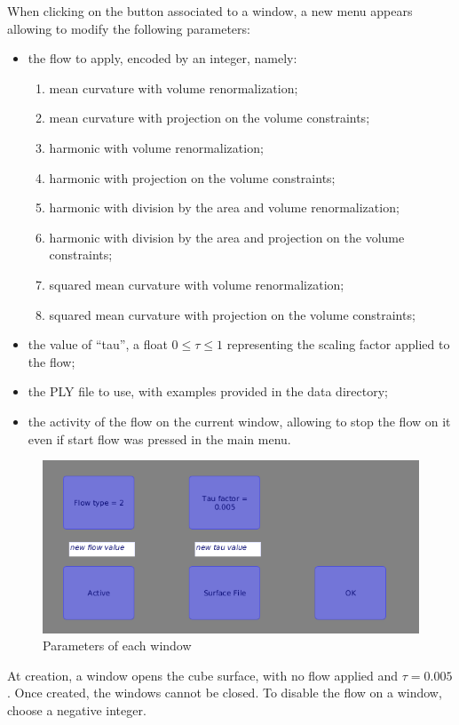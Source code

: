 \documentclass{article}
\begin{document}
When clicking on the button associated to a window, a new menu appears
allowing to modify the following parameters:
\begin{itemize}
  \item the flow to apply, encoded by an integer, namely:
  \begin{enumerate}
    \item mean curvature with volume renormalization;
    \item mean curvature with projection on the volume constraints;
    \item harmonic with volume renormalization;
    \item harmonic with projection on the volume constraints;
    \item harmonic with division by the area and volume renormalization;
    \item harmonic with division by the area and projection on the volume constraints;
    \item squared mean curvature with volume renormalization;
    \item squared mean curvature with projection on the volume constraints;
  \end{enumerate}
  \item the value of ``tau'', a float $0 \leq \tau \leq 1$ representing the scaling factor applied to the flow;
  \item the PLY file to use, with examples provided in the data directory;
  \item the activity of the flow on the current window,
    allowing to stop the flow on it even if start flow was pressed in the main menu.
\end{itemize}

\begin{figure}[h]
  \begin{center}
    \includegraphics[width=.5\textwidth]{img/win_params.png}
    \caption{Parameters of each window}
    \label{fig:win_params}
  \end{center}
\end{figure}

At creation, a window opens the cube surface, with no flow applied and $\tau = 0.005$.
Once created, the windows cannot be closed. To disable the flow on a window,
choose a negative integer.
\end{document}

